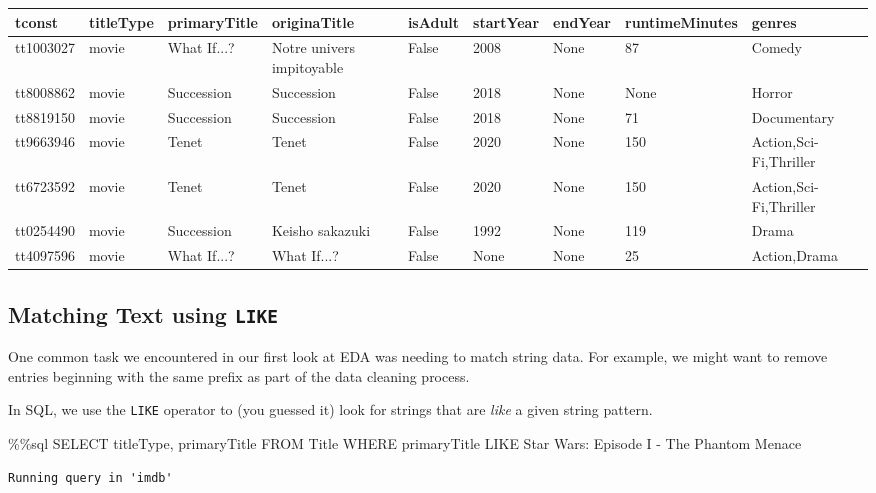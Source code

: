 \documentclass[
  letterpaper,
  DIV=11,
  numbers=noendperiod]{scrreprt}
\newenvironment{Shaded}{\begin{snugshade}}{\end{snugshade}}
\newcommand{\NormalTok}[1]{\textcolor[rgb]{0.00,0.23,0.31}{#1}}
\newcommand{\OperatorTok}[1]{\textcolor[rgb]{0.37,0.37,0.37}{#1}}
\newcommand{\StringTok}[1]{\textcolor[rgb]{0.13,0.47,0.30}{#1}}
\begin{document}
\begin{longtable}[]{@{}lllllllll@{}}
\toprule\noalign{}
tconst & titleType & primaryTitle & originaTitle & isAdult & startYear &
endYear & runtimeMinutes & genres \\
\midrule\noalign{}
\endhead
\bottomrule\noalign{}
\endlastfoot
tt1003027 & movie & What If...? & Notre univers impitoyable & False &
2008 & None & 87 & Comedy \\
tt8008862 & movie & Succession & Succession & False & 2018 & None & None
& Horror \\
tt8819150 & movie & Succession & Succession & False & 2018 & None & 71 &
Documentary \\
tt9663946 & movie & Tenet & Tenet & False & 2020 & None & 150 &
Action,Sci-Fi,Thriller \\
tt6723592 & movie & Tenet & Tenet & False & 2020 & None & 150 &
Action,Sci-Fi,Thriller \\
tt0254490 & movie & Succession & Keisho sakazuki & False & 1992 & None &
119 & Drama \\
tt4097596 & movie & What If...? & What If...? & False & None & None & 25
& Action,Drama \\
\end{longtable}

\subsection{\texorpdfstring{Matching Text using
\texttt{LIKE}}{Matching Text using LIKE}}\label{matching-text-using-like}

One common task we encountered in our first look at EDA was needing to
match string data. For example, we might want to remove entries
beginning with the same prefix as part of the data cleaning process.

In SQL, we use the \texttt{LIKE} operator to (you guessed it) look for
strings that are \emph{like} a given string pattern.

\begin{Shaded}
\begin{Highlighting}[]
\OperatorTok{\%\%}\NormalTok{sql}
\NormalTok{SELECT titleType, primaryTitle}
\NormalTok{FROM Title}
\NormalTok{WHERE primaryTitle LIKE }\StringTok{\textquotesingle{}Star Wars: Episode I {-} The Phantom Menace\textquotesingle{}}
\end{Highlighting}
\end{Shaded}

\begin{verbatim}
Running query in 'imdb'
\end{verbatim}
\end{document}
